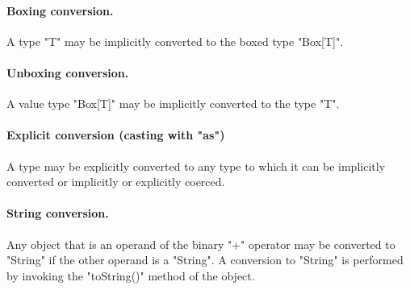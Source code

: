 \paragraph{Boxing conversion.}
A type \xcd"T" may be implicitly converted to the
boxed type \xcd"Box[T]".


\paragraph{Unboxing conversion.}
A value type \xcd"Box[T]" may be implicitly converted to the
type \xcd"T".


\paragraph{Explicit conversion (casting with \xcd"as")}
A type may be explicitly converted to any type to which it can be
implicitly converted or implicitly or explicitly coerced.


\paragraph{String conversion.}
Any object that is an operand of the binary
\xcd"+" operator may
be converted to \xcd"String" if the other operand is a \xcd"String".
A conversion to \xcd"String" is performed by invoking the \xcd"toString()"
method of the object.


